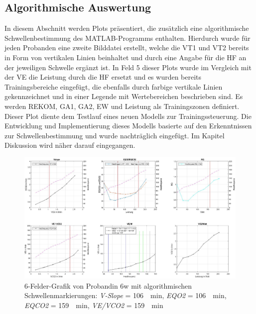 \subsection{Algorithmische Auswertung}

In diesem Abschnitt werden Plots präsentiert, die zusätzlich eine algorithmische Schwellenbestimmung des MATLAB-Programms enthalten. Hierdurch wurde für jeden Probanden eine zweite Bilddatei erstellt, welche die VT1 und VT2 bereits in Form von vertikalen Linien beinhaltet und durch eine Angabe für die \acs{HF} an der jeweiligen Schwelle ergänzt ist. In Feld 5 dieser Plots wurde im Vergleich mit der \acs{VE} die Leistung durch die \acs{HF} ersetzt und es wurden bereits Trainingsbereiche eingefügt, die ebenfalls durch farbige vertikale Linien gekennzeichnet und in einer Legende mit Wertebereichen beschrieben sind. Es werden \ac{REKOM}, \ac{GA1}, \ac{GA2}, \ac{EW} und Leistung als Trainingszonen definiert. Dieser Plot diente dem Testlauf eines neuen Modells zur Trainingssteuerung. Die Entwicklung und Implementierung dieses Modells basierte auf den Erkenntnissen zur Schwellenbestimmung und wurde nachträglich eingefügt. Im Kapitel Diskussion wird näher darauf eingegangen.
%
\begin{figure}[H]
	\centering
	\noindent\includegraphics[angle=0,width=\linewidth,keepaspectratio]{Bilder/auto_6}
	\caption[6-Felder-Grafik von Probandin 6w mit algorithmischen Schwellenmarkierungen]{6-Felder-Grafik von Probandin 6w mit algorithmischen Schwellenmarkierungen: \textsl{V-Slope} = \SI{106}{\per\minute}, \textsl{\acs{EQO2}} = \SI{106}{\per\minute}, \textsl{\acs{EQCO2}} = \SI{159}{\per\minute}, \textsl{\acs{VE}/\acs{VCO2}} = \SI{159}{\per\minute}}
	\label{pic:pic17}
\end{figure}
%
